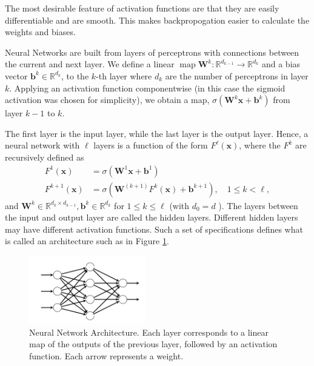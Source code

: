 \documentclass[a4paper,11pt]{article}
\theoremstyle{plain} %
\theoremstyle{definition} %
\theoremstyle{remark} %
\begin{document}
The most desirable feature of activation functions are that they are easily differentiable and are smooth. This makes backpropogation easier to calculate the weights and biases.

Neural Networks are built from layers of perceptrons with connections between the current and next layer.
We define a linear $\operatorname{map} \boldsymbol{W}^k: \mathbb{R}^{d_{k-1}} \rightarrow \mathbb{R}^{d_k}$ and a bias vector $\boldsymbol{b}^k \in \mathbb{R}^{d_k}$, to the $k$-th layer where $d_k$ are the number of perceptrons in layer $k$. Applying an activation function componentwise (in this case the sigmoid activation was chosen for simplicity), we obtain a map,
$
\sigma\left(\boldsymbol{W}^k \boldsymbol{x}+\boldsymbol{b}^k\right)
$ from layer $k-1$ to $k$.

The first layer is the input layer, while the last layer is the output layer. Hence, a neural network with $\ell$ layers is a function of the form $F^{\ell}(\boldsymbol{x})$, where the $F^k$ are recursively defined as
$$
\begin{aligned}
F^1(\boldsymbol{x}) & =\sigma\left(\boldsymbol{W}^1 \boldsymbol{x}+\boldsymbol{b}^1\right) \\
F^{k+1}(\boldsymbol{x}) & =\sigma\left(\boldsymbol{W}^{(k+1)} F^k(\boldsymbol{x})+\boldsymbol{b}^{k+1}\right), \quad 1 \leq k<\ell,
\end{aligned}
$$
and $\boldsymbol{W}^k \in \mathbb{R}^{d_k \times d_{k-1}}, \boldsymbol{b}^k \in \mathbb{R}^{d_k}$ for $1 \leq k \leq \ell$ (with $d_0=d$ ). The layers between the input and output layer are called the hidden layers. Different hidden layers may have different activation functions. Such a set of specifications defines what is called an architecture such as in Figure \cref{AI}.

\begin{figure}[htb]
	\centering 
	\includegraphics[width=0.45\textwidth, angle=0]{Picture1.png}	
	\caption{Neural Network Architecture.  Each layer corresponds to a linear map of the outputs of the
previous layer, followed by an activation function. Each arrow represents a weight.} 
	\label{AI}%
\end{figure}
\end{document}
